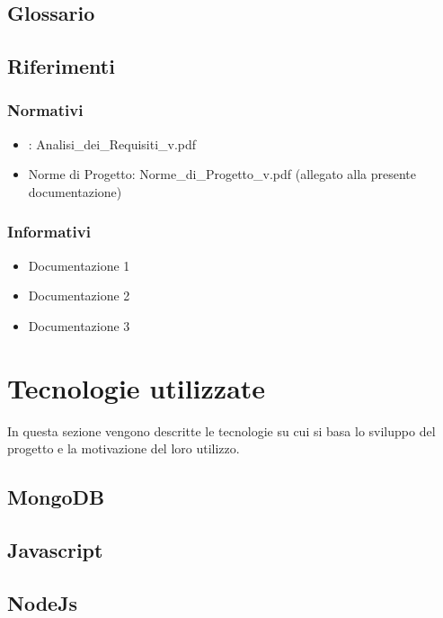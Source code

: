\subsection{Glossario}%
\label{1.3}
\Glossario{}

\subsection{Riferimenti}
\label{1.4}

\subsubsection{Normativi}
\label{1.4.1}
\begin{itemize}
\item {}: Analisi\_{}dei\_{}Requisiti\_{}v\versioneNormeDiProgetto{}.pdf
\item Norme di Progetto: Norme\_{}di\_{}Progetto\_{}v\versioneNormeDiProgetto{}.pdf  (allegato alla presente documentazione)\\
\end{itemize}

\subsubsection{Informativi}
\label{1.4.2}
\begin{itemize}
\item Documentazione 1
\item Documentazione 2
\item Documentazione 3
\end{itemize}

\newpage
\section{Tecnologie utilizzate}
In questa sezione vengono descritte le tecnologie su cui si basa lo sviluppo del progetto e la motivazione del loro utilizzo.
\subsection{MongoDB}
\subsection{Javascript}
\subsection{NodeJs}
